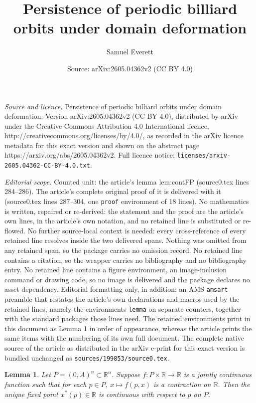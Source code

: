 \documentclass[10pt,a4paper]{amsart}
\title{Persistence of periodic billiard orbits under domain deformation}
\author{Samuel Everett}
\date{Source: arXiv:2605.04362v2 (CC BY 4.0)}
\newtheorem{lemma}{Lemma}
\newcommand{\RR}{\mathbb{R}}
\begin{document}
\maketitle

\noindent\emph{Source and licence.} Persistence of periodic billiard orbits under domain deformation. Version arXiv:2605.04362v2 (CC BY 4.0), distributed by arXiv under the Creative Commons Attribution 4.0 International licence, http://creativecommons.org/licenses/by/4.0/, as recorded in the arXiv licence metadata for this exact version and shown on the abstract page https://arxiv.org/abs/2605.04362v2. Full licence notice: \texttt{licenses/arxiv-2605.04362-CC-BY-4.0.txt}.\par\smallskip

\noindent\textit{Editorial scope.} Counted unit: the article's lemma lem:contFP (source0.tex lines 284--286). The article's complete original proof of it is delivered with it (source0.tex lines 287--304, one \texttt{proof} environment of 18 lines). No mathematics is written, repaired or re-derived: the statement and the proof are the article's own lines, in the article's own notation, and no retained line is substituted or re-flowed.  No further source-local context is needed: every cross-reference of every retained line resolves inside the two delivered spans.  Nothing was omitted from any retained span, so the package carries no omission record.  No retained line contains a citation, so the wrapper carries no bibliography and no bibliography entry.  No retained line contains a figure environment, an image-inclusion command or drawing code, so no image is delivered and the package declares no asset dependency.  Editorial formatting only, in addition: an AMS \texttt{amsart} preamble that restates the article's own declarations and macros used by the retained lines, namely the environments \texttt{lemma} on separate counters, together with the standard packages those lines need.  The retained environments print in this document as Lemma 1 in order of appearance, whereas the article prints the same items with the numbering of its own full document.  The complete native source of the article as distributed in the arXiv e-print for this exact version is bundled unchanged as \texttt{sources/199853/source0.tex}.
\begin{lemma}\label{lem:contFP}
Let $P = (0,A)^n\subset \RR^n$. Suppose $f:P\times \RR\rightarrow \RR$ is a jointly continuous function such that for each $p \in P$, $x\mapsto f(p, x)$ is a contraction on $\RR$. Then the unique fixed point $x^*(p) \in \RR$ is continuous with respect to $p$ on $P$.
\end{lemma}
\end{document}
